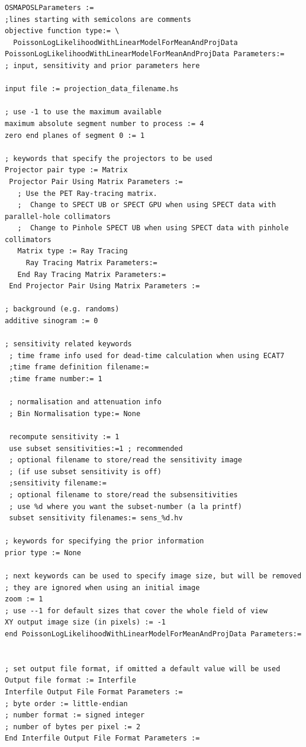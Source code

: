 \documentclass{article}
\begin{document}
{\small 
\begin{verbatim}
OSMAPOSLParameters :=
;lines starting with semicolons are comments
objective function type:= \
  PoissonLogLikelihoodWithLinearModelForMeanAndProjData
PoissonLogLikelihoodWithLinearModelForMeanAndProjData Parameters:=
; input, sensitivity and prior parameters here

input file := projection_data_filename.hs

; use -1 to use the maximum available
maximum absolute segment number to process := 4
zero end planes of segment 0 := 1

; keywords that specify the projectors to be used
Projector pair type := Matrix 
 Projector Pair Using Matrix Parameters := 
   ; Use the PET Ray-tracing matrix.
   ;  Change to SPECT UB or SPECT GPU when using SPECT data with parallel-hole collimators
   ;  Change to Pinhole SPECT UB when using SPECT data with pinhole collimators
   Matrix type := Ray Tracing
     Ray Tracing Matrix Parameters:=
   End Ray Tracing Matrix Parameters:= 
 End Projector Pair Using Matrix Parameters :=

; background (e.g. randoms)
additive sinogram := 0

; sensitivity related keywords
 ; time frame info used for dead-time calculation when using ECAT7
 ;time frame definition filename:=
 ;time frame number:= 1

 ; normalisation and attenuation info
 ; Bin Normalisation type:= None
 
 recompute sensitivity := 1
 use subset sensitivities:=1 ; recommended 
 ; optional filename to store/read the sensitivity image 
 ; (if use subset sensitivity is off)
 ;sensitivity filename:=
 ; optional filename to store/read the subsensitivities
 ; use %d where you want the subset-number (a la printf)
 subset sensitivity filenames:= sens_%d.hv

; keywords for specifying the prior information
prior type := None

; next keywords can be used to specify image size, but will be removed
; they are ignored when using an initial image
zoom := 1
; use --1 for default sizes that cover the whole field of view
XY output image size (in pixels) := -1
end PoissonLogLikelihoodWithLinearModelForMeanAndProjData Parameters:=


; set output file format, if omitted a default value will be used
Output file format := Interfile 
Interfile Output File Format Parameters := 
; byte order := little-endian 
; number format := signed integer 
; number of bytes per pixel := 2 
End Interfile Output File Format Parameters :=


\end{verbatim}}
\end{document}
